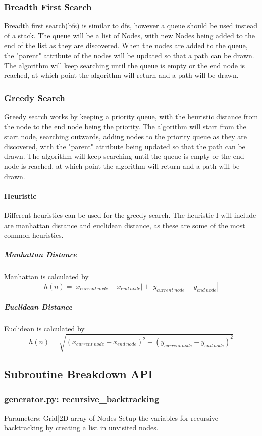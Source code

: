 \documentclass[titlepage]{article}
\begin{document}
\subsubsection{Breadth First Search}
Breadth first search(bfs) is similar to dfs, however a queue should be used instead of a stack. The queue will be a list of Nodes, with new Nodes being added to the end of the list as they are discovered. When the nodes are added to the queue, the "parent" attribute of the nodes will be updated so that a path can be drawn. The algorithm will keep searching until the queue is empty or the end node is reached, at which point the algorithm will return and a path will be drawn.

\subsubsection{Greedy Search}
Greedy search works by keeping a priority queue, with the heuristic distance from the node to the end node being the priority. The algorithm will start from the start node, searching outwards, adding nodes to the priority queue as they are discovered, with the "parent" attribute being updated so that the path can be drawn. The algorithm will keep searching until the queue is empty or the end node is reached, at which point the algorithm will return and a path will be drawn.
\paragraph*{Heuristic}
Different heuristics can be used for the greedy search. The heuristic I will include are manhattan distance and euclidean distance, as these are some of the most common heuristics.

\subparagraph*{Manhattan Distance}
Manhattan is calculated by
\begin{equation}
    h(n) = |x_{current\ node} - x_{end\ node}| + |y_{current\ node} - y_{end\ node}|
\end{equation}
\subparagraph*{Euclidean Distance}
Euclidean is calculated by
\begin{equation}
    h(n) = \sqrt{(x_{current\ node} - x_{end\ node})^2 + (y_{current\ node} - y_{end\ node})^2}
\end{equation}

\subsection{Subroutine Breakdown API}
\subsubsection{generator.py: recursive\_backtracking}
Parameters:\newline
\indent Grid|2D array of Nodes\newline
Setup the variables for recursive backtracking by creating a list in unvisited nodes.
\end{document}

